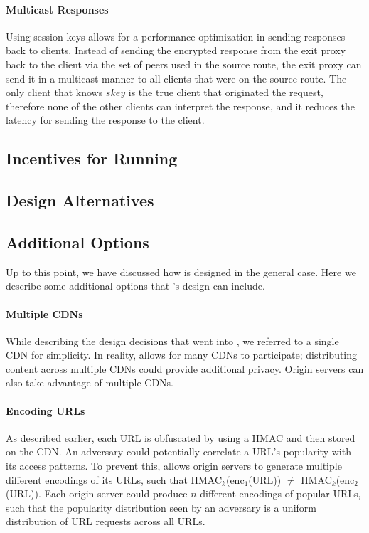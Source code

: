 \paragraph{Multicast Responses}
Using session keys allows for a performance optimization in sending responses back to clients.  Instead of sending 
the encrypted response from the exit proxy back to the client via the set of peers used in the source route, the exit 
proxy can send it in a multicast manner to all clients that were on the source route.  The only client that knows $skey$ 
is the true client that originated the request, therefore none of the other clients can interpret the response, and it reduces the 
latency for sending the response to the client.  

\subsection{Incentives for Running \system{}}

\subsection{Design Alternatives}

\subsection{Additional Options}
Up to this point, we have discussed how \system{} is designed in the general case.  Here we describe some 
additional options that \system{}'s design can include.

\paragraph{Multiple CDNs}
While describing the design decisions that went into \system{}, we referred to a single CDN for 
simplicity.  In reality, \system{} allows for many CDNs to participate;
distributing content across
multiple CDNs could provide additional privacy. Origin servers can also take advantage
of multiple CDNs.

\paragraph{Encoding URLs}
As described earlier, each URL is obfuscated by using a HMAC and then stored on the CDN.  An adversary 
could potentially correlate a URL's popularity with its access patterns.  To prevent this, \system{} allows 
origin servers to generate multiple different encodings of its URLs, such that HMAC$_k$(enc$_1$(URL)) $\neq$ 
HMAC$_k$(enc$_2$(URL)).  Each origin server could produce $n$ different encodings of popular URLs, such that 
the popularity distribution seen by an adversary is a uniform distribution of URL requests across all URLs.  

